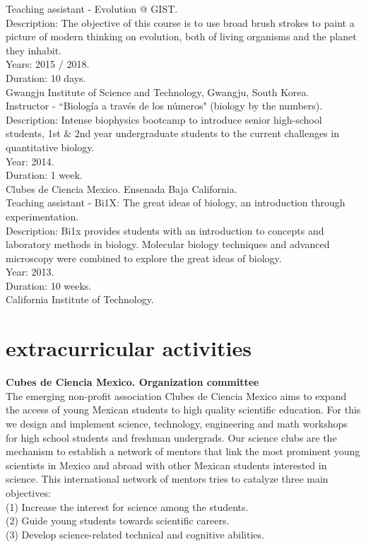 \documentclass[]{friggeri-cv}
\begin{document}
Teaching assistant - Evolution @ GIST.\\
Description: The objective of this course is to use broad brush strokes to paint a picture of modern thinking on evolution, both of living organisms and the planet they inhabit.\\
Years: 2015 / 2018.\\
Duration: 10 days.\\
{Gwangju Institute of Science and Technology, Gwangju, South Korea.}\\


Instructor - ``Biolog\'{i}a a trav\'{e}s de los n\'{u}meros" (biology by the numbers).\\
Description: Intense biophysics bootcamp to introduce senior high-school students, 1st \& 2nd year undergraduate students to the current challenges in quantitative biology.\\
Year: 2014.\\
Duration: 1 week.\\
{Clubes de Ciencia Mexico. Ensenada Baja California.}\\

Teaching assistant - Bi1X: The great ideas of biology, an introduction through experimentation.\\
Description: Bi1x provides students with an introduction to concepts and laboratory methods in biology. Molecular biology techniques and advanced microscopy were combined to explore the great ideas of biology.\\
Year: 2013.\\
Duration: 10 weeks.\\
{California Institute of Technology.}\\

\section{extracurricular activities}
\textbf{Cubes de Ciencia Mexico. Organization committee}\\
The emerging non-profit association Clubes de Ciencia Mexico aims to expand the access of young Mexican students to high quality scientific education. For this we design and implement science, technology, engineering and math workshops for high school students and freshman undergrads. Our science clubs are the mechanism to establish a network of mentors that link the most prominent young scientists in Mexico and abroad with other Mexican students interested in science. This international network of mentors tries to catalyze three main objectives:\\
(1) Increase the interest for science among the students.\\
(2) Guide young students towards scientific careers.\\
(3) Develop science-related technical and cognitive abilities.
\end{document}

